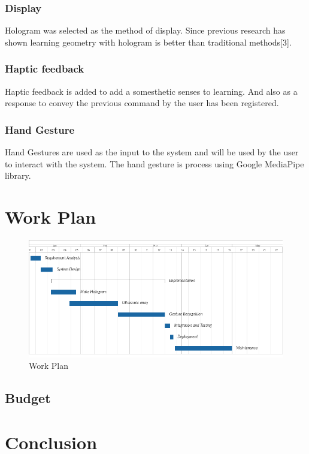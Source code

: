 \documentclass{fisatproject}
\begin{document}
\subsection{Display}
Hologram was selected as the method of display. Since previous  research has shown learning geometry with hologram is better than traditional methods[3].

\subsection{Haptic feedback}
Haptic feedback is added to add a somesthetic senses to learning. And also as a response to convey the previous command by the user has been registered.

\subsection{Hand Gesture}
Hand Gestures are used as the input to the system and will be used by the user to interact with the system.
The hand gesture is process using Google  MediaPipe library.

\chapter{Work Plan}
    \begin{figure}[h!]
        \begin{center}
        \includegraphics[scale=.6]{images/work_plan.png}
        \caption{Work Plan}
        \end{center}
        \end{figure}
 \section{Budget}
\chapter{Conclusion}
\end{document}
